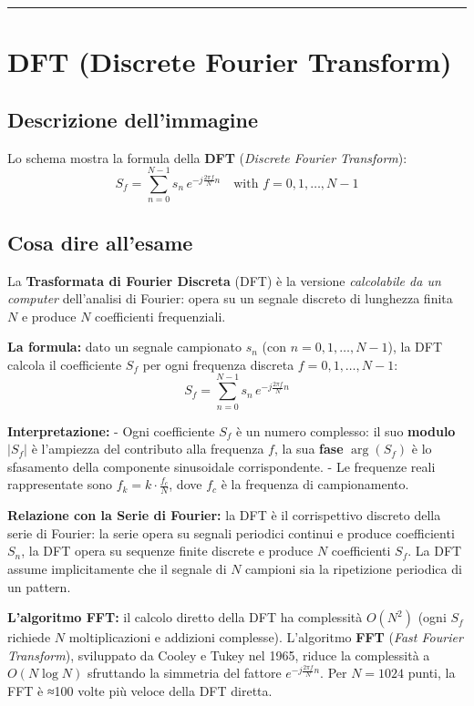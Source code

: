 \documentclass[
  italian,
  openany]{book}
\begin{document}
\begin{center}\rule{0.5\linewidth}{0.5pt}\end{center}

\section{DFT (Discrete Fourier
Transform)}\label{dft-discrete-fourier-transform}

\subsection{Descrizione
dell'immagine}\label{descrizione-dellimmagine-15}

Lo schema mostra la formula della \textbf{DFT} (\emph{Discrete Fourier
Transform}):
\[S_f = \sum_{n=0}^{N-1} s_n \, e^{-j\frac{2\pi f}{N}n} \quad \text{with } f = 0, 1, \ldots, N-1\]

\subsection{Cosa dire all'esame}\label{cosa-dire-allesame-15}

La \textbf{Trasformata di Fourier Discreta} (DFT) è la versione
\emph{calcolabile da un computer} dell'analisi di Fourier: opera su un
segnale discreto di lunghezza finita \(N\) e produce \(N\) coefficienti
frequenziali.

\textbf{La formula:} dato un segnale campionato \(s_n\) (con
\(n = 0, 1, \ldots, N-1\)), la DFT calcola il coefficiente \(S_f\) per
ogni frequenza discreta \(f = 0, 1, \ldots, N-1\):
\[S_f = \sum_{n=0}^{N-1} s_n \, e^{-j\frac{2\pi f}{N}n}\]

\textbf{Interpretazione:} - Ogni coefficiente \(S_f\) è un numero
complesso: il suo \textbf{modulo} \(|S_f|\) è l'ampiezza del contributo
alla frequenza \(f\), la sua \textbf{fase} \(\arg(S_f)\) è lo sfasamento
della componente sinusoidale corrispondente. - Le frequenze reali
rappresentate sono \(f_k = k \cdot \frac{f_c}{N}\), dove \(f_c\) è la
frequenza di campionamento.

\textbf{Relazione con la Serie di Fourier:} la DFT è il corrispettivo
discreto della serie di Fourier: la serie opera su segnali periodici
continui e produce coefficienti \(S_n\), la DFT opera su sequenze finite
discrete e produce \(N\) coefficienti \(S_f\). La DFT assume
implicitamente che il segnale di \(N\) campioni sia la ripetizione
periodica di un pattern.

\textbf{L'algoritmo FFT:} il calcolo diretto della DFT ha complessità
\(O(N^2)\) (ogni \(S_f\) richiede \(N\) moltiplicazioni e addizioni
complesse). L'algoritmo \textbf{FFT} (\emph{Fast Fourier Transform}),
sviluppato da Cooley e Tukey nel 1965, riduce la complessità a
\(O(N \log N)\) sfruttando la simmetria del fattore
\(e^{-j\frac{2\pi f}{N}n}\). Per \(N = 1024\) punti, la FFT è ≈100 volte
più veloce della DFT diretta.
\end{document}
